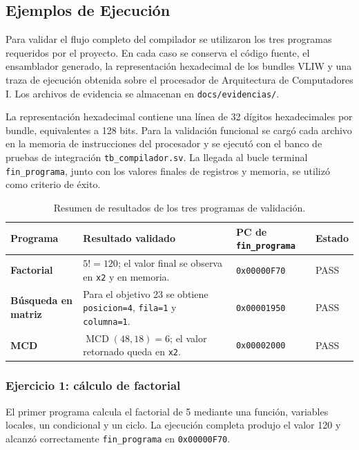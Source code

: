 \documentclass[11pt,letterpaper]{article}
\begin{document}
\subsection{Ejemplos de Ejecución}
\label{sec:ejemplos_ejecucion}

Para validar el flujo completo del compilador se utilizaron los tres programas requeridos por el proyecto. En cada caso se conserva el código fuente, el ensamblador generado, la representación hexadecimal de los bundles VLIW y una traza de ejecución obtenida sobre el procesador de Arquitectura de Computadores I. Los archivos de evidencia se almacenan en \texttt{docs/evidencias/}.

La representación hexadecimal contiene una línea de 32 dígitos hexadecimales por bundle, equivalentes a 128 bits. Para la validación funcional se cargó cada archivo en la memoria de instrucciones del procesador y se ejecutó con el banco de pruebas de integración \texttt{tb\_compilador.sv}. La llegada al bucle terminal \texttt{fin\_programa}, junto con los valores finales de registros y memoria, se utilizó como criterio de éxito.

\begin{table}[H]
\centering
\caption{Resumen de resultados de los tres programas de validación.}
\begin{tabularx}{\textwidth}{>{\bfseries}p{3.2cm}X p{2.4cm} p{2.2cm}}
\toprule
Programa & Resultado validado & PC de \texttt{fin\_programa} & Estado \\
\midrule
Factorial & $5! = 120$; el valor final se observa en \texttt{x2} y en memoria. & \texttt{0x00000F70} & PASS \\
Búsqueda en matriz & Para el objetivo 23 se obtiene \texttt{posicion=4}, \texttt{fila=1} y \texttt{columna=1}. & \texttt{0x00001950} & PASS \\
MCD & $\operatorname{MCD}(48,18)=6$; el valor retornado queda en \texttt{x2}. & \texttt{0x00002000} & PASS \\
\bottomrule
\end{tabularx}
\end{table}

\subsubsection{Ejercicio 1: cálculo de factorial}

El primer programa calcula el factorial de 5 mediante una función, variables locales, un condicional y un ciclo. La ejecución completa produjo el valor 120 y alcanzó correctamente \texttt{fin\_programa} en \texttt{0x00000F70}.
\end{document}
